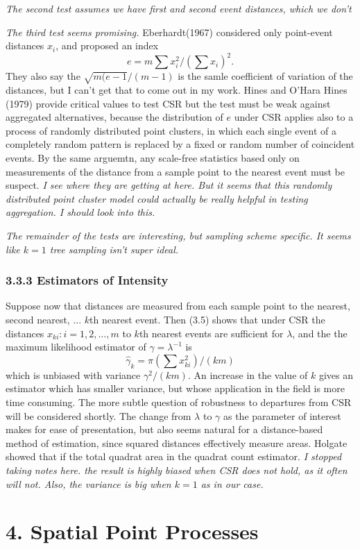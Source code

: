 \documentclass{article}
\begin{document}
{\it The second test assumes we have first and second event distances, which we don't}

{\it The third test seems promising.} Eberhardt(1967) considered only point-event distances $x_i$, and proposed an index $$e = m\sum x_i^2 / (\sum x_i)^2.$$ They also say the $\sqrt{m(e-1}/(m-1)$ is the samle coefficient of variation of the distances, but I can't get that to come out in my work. Hines and O'Hara Hines (1979) provide critical values to test CSR but the test must be weak against aggregated alternatives, because the distribution of $e$ under CSR applies also to a process of randomly distributed point clusters, in which each single event of a completely random pattern is replaced by a fixed or random number of coincident events. By the same arguemtn, any scale-free statistics based only on measurements of the distance from a sample point to the nearest event must be suspect. {\it I see where they are getting at here. But it seems that this randomly distributed point cluster model could actually be really helpful in testing aggregation. I should look into this.} 

{\it The remainder of the tests are interesting, but sampling scheme specific. It seems like $k = 1$ tree sampling isn't super ideal.}

\subsubsection{3.3.3 Estimators of Intensity}
Suppose now that distances are measured from each sample point to the nearest, second nearest, ... $k$th nearest event. Then (3.5) shows that under CSR the distances $x_{ki}:i = 1, 2, \dots, m$ to $k$th nearest events are sufficient for $\lambda$, and the the maximum likelihood estimator of $\gamma = \lambda^{-1}$ is $$\hat{\gamma}_k = \pi (\sum x_{ki}^2) / (km)$$ which is unbiased with variance $\gamma^2/(km)$. An increase in the value of $k$ gives an estimator which has smaller variance, but whose application in the field is more time consuming. The more subtle question of robustness to departures from CSR will be considered shortly. The change from $\lambda$ to $\gamma$ as the parameter of interest makes for ease of presentation, but also seems natural for a distance-based method of estimation, since squared distances effectively measure areas. Holgate showed that if the total quadrat area in the quadrat count estimator. {\it I stopped taking notes here. the result is highly biased when CSR does not hold, as it often will not. Also, the variance is big when $k = 1$ as in our case.}

\section{4. Spatial Point Processes}
\end{document}
